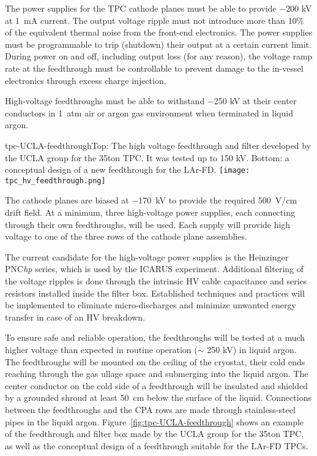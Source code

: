 The power supplies for the TPC cathode planes 
must be able to provide $-200$ kV at 1~mA current. The output voltage ripple 
must not introduce more than 10\% of the equivalent thermal noise from the front-end electronics. 
The power supplies must be programmable to trip (shutdown) 
their output at a certain current limit.  During power on and off, 
including output loss (for any reason), the voltage ramp rate at the 
feedthrough must be controllable to prevent 
damage to the in-vessel electronics through excess charge injection.

High-voltage feedthroughs must be able to withstand $-$250 kV 
at their center conductors in 1~atm air or argon gas environment when terminated in liquid argon.

\begin{cdrfigure}{tpc-UCLA-feedthrough}{Top: The high voltage feedthrough and filter developed by the UCLA 
group for the 35ton TPC.  It was tested up to 150 kV.  Bottom: a conceptual design of a new feedthrough for the LAr-FD.}
\texttt{[image: tpc\_hv\_feedthrough.png]}
\end{cdrfigure}


The cathode planes are biased at $-$170~kV to provide the required 
500~V/cm drift field. At a minimum, three high-voltage power 
supplies, each connecting through their own feedthroughs, will be used. Each supply will
provide high voltage to one of the three rows of the cathode plane assemblies.

The current candidate for the high-voltage power supplies is 
the Heinzinger PNC{\it hp} series, which is used by the ICARUS 
experiment.  Additional filtering of the voltage ripples is done through the intrinsic HV cable capacitance 
and series resistors installed inside the filter box. Established techniques and practices will be implemented to eliminate 
micro-discharges and minimize unwanted energy transfer in case of an HV breakdown. 
  
To ensure safe and reliable operation, the feedthroughs will be 
tested at a much higher voltage than expected in
routine operation ($\sim$ 250 kV) in liquid argon. 
 The feedthroughs will be 
mounted on the ceiling of the cryostat, their cold ends reaching 
through the gas ullage space and submerging into the liquid argon. 
The center conductor on the cold side of a feedthrough will be 
insulated and shielded by a grounded shroud at least 50~cm below the 
surface of the liquid. Connections between the feedthroughs 
and the CPA rows are made through stainless-steel pipes in the 
liquid argon. Figure~\ref{fig:tpc-UCLA-feedthrough} shows an example 
of the feedthrough and filter box made by the UCLA group for the 35ton TPC, as well as the conceptual design of a feedthrough suitable for the LAr-FD TPCs.

